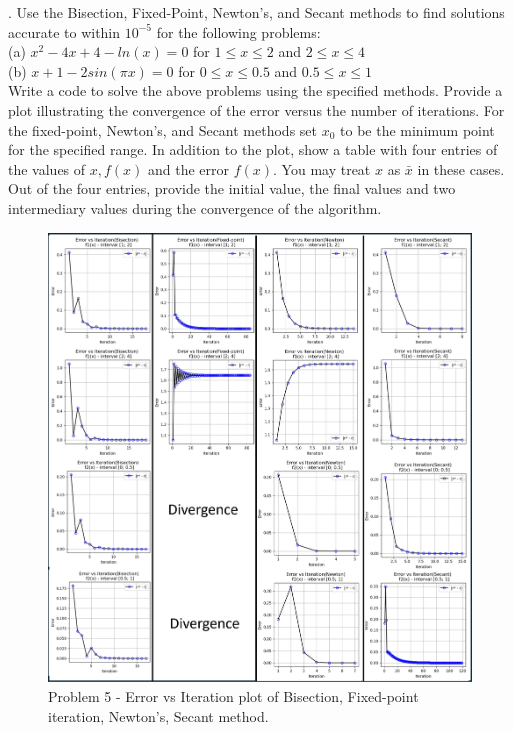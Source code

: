 \documentclass{article} %
\begin{document}
{    . Use the Bisection, Fixed-Point, Newton’s, and Secant methods to find solutions accurate to within 
    $ 10^{-5} $ for the following problems: \\
    (a) $ x^2 - 4x + 4 - ln(x) = 0 $ for $ 1 \leq x \leq 2 $ and $ 2 \leq x \leq 4 $ \\
    (b) $ x + 1 - 2sin(\pi x) = 0 $ for $ 0 \leq x \leq 0.5 $ and $ 0.5 \leq x \leq 1 $ \\
    Write a code to solve the above problems using the specified methods. Provide a plot illustrating the
    convergence of the error versus the number of iterations. For the fixed-point, Newton’s, and Secant
    methods set $ x_0 $ to be the minimum point for the specified range. In addition to the plot, show a table
    with four entries of the values of $ x, f(x) $ and the error $ f(x) $. You may treat $ x $ as $ \bar{x} $ in these cases. Out
    of the four entries, provide the initial value, the final values and two intermediary values during the
    convergence of the algorithm. \\

    \begin{figure}[h!]
    \centering
    \includegraphics[width=1\textwidth]{generated_image4.png}
    \caption{Problem 5 - Error vs Iteration plot of Bisection, Fixed-point iteration, Newton's, Secant method.}
    \label{fig3}
    \end{figure}

}
\end{document}
